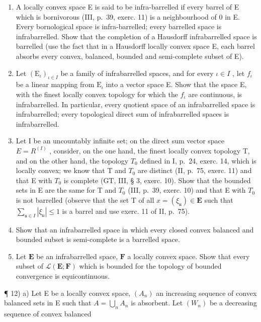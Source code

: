 \begin{enumerate}
\def\labelenumi{\arabic{enumi})}
\setcounter{enumi}{6}
\item
  A locally convex space E is said to be infra-barrelled if every barrel of E which is bornivorous (III, p.~39, exerc. 11) is a neighbourhood of 0 in E. Every bornological space is infra-barrelled; every barrelled space is infrabarrelled. Show that the completion of a Hausdorff infrabarrelled space is barrelled (use the fact that in a Hausdorff locally convex space E, each barrel absorbs every convex, balanced, bounded and semi-complete subset of E).
\item
  Let \((\mathrm{E}_{\iota})_{\iota\in I}\) be a family of infrabarrelled spaces, and for every \(\iota\in I\) , let \(f_{\iota}\) be a linear mapping from \(\mathrm{E}_{\iota}\) into a vector space E. Show that the space E, with the finest locally convex topology for which the \(f_{\iota}\) are continuous, is infrabarrelled. In particular, every quotient space of an infrabarrelled space is infrabarrelled; every topological direct sum of infrabarrelled spaces is infrabarrelled.
\item
  Let I be an uncountably infinite set; on the direct sum vector space \(E = R^{(I)}\) , consider, on the one hand, the finest locally convex topology T, and on the other hand, the topology \(T_{0}\) defined in I, p.~24, exerc. 14, which is locally convex; we know that T and \(T_{0}\) are distinct (II, p.~75, exerc. 11) and that E with \(T_{0}\) is complete (GT, III, § 3, exerc. 10). Show that the bounded sets in E are the same for T and \(T_{0}\) (III, p.~39, exerc. 10) and that E with \(T_{0}\) is not barrelled (observe that the set T of all \(x = (\xi_{\mathfrak{u}}) \in \mathbf{E}\) such that \(\sum_{\mathfrak{u} \in I} |\xi_{\mathfrak{u}}| \leqslant 1\) is a barrel and use exerc. 11 of II, p.~75).
\item
  Show that an infrabarrelled space in which every closed convex balanced and bounded subset is semi-complete is a barrelled space.
\item
  Let \(\mathbf{E}\) be an infrabarrelled space, \(\mathbf{F}\) a locally convex space. Show that every subset of \(\mathcal{L}(\mathbf{E};\mathbf{F})\) which is bounded for the topology of bounded convergence is equicontinuous.
\end{enumerate}

¶ 12) a) Let E be a locally convex space, \((A_n)\) an increasing sequence of convex balanced sets in E such that \(A = \bigcup_{n} A_n\) is absorbent. Let \((W_n)\) be a decreasing sequence of convex balanced

